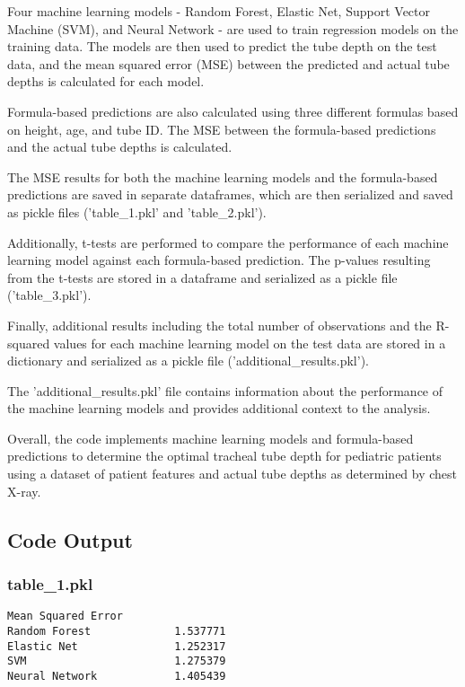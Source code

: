 \documentclass[11pt]{article}
\begin{document}
Four machine learning models - Random Forest, Elastic Net, Support Vector Machine (SVM), and Neural Network - are used to train regression models on the training data. The models are then used to predict the tube depth on the test data, and the mean squared error (MSE) between the predicted and actual tube depths is calculated for each model.

Formula-based predictions are also calculated using three different formulas based on height, age, and tube ID. The MSE between the formula-based predictions and the actual tube depths is calculated.

The MSE results for both the machine learning models and the formula-based predictions are saved in separate dataframes, which are then serialized and saved as pickle files ('table\_1.pkl' and 'table\_2.pkl').

Additionally, t-tests are performed to compare the performance of each machine learning model against each formula-based prediction. The p-values resulting from the t-tests are stored in a dataframe and serialized as a pickle file ('table\_3.pkl').

Finally, additional results including the total number of observations and the R-squared values for each machine learning model on the test data are stored in a dictionary and serialized as a pickle file ('additional\_results.pkl').

The 'additional\_results.pkl' file contains information about the performance of the machine learning models and provides additional context to the analysis.

Overall, the code implements machine learning models and formula-based predictions to determine the optimal tracheal tube depth for pediatric patients using a dataset of patient features and actual tube depths as determined by chest X-ray.

\subsection{Code Output}

\subsubsection*{table\_1.pkl}

\begin{Verbatim}[tabsize=4]
                Mean Squared Error
Random Forest             1.537771
Elastic Net               1.252317
SVM                       1.275379
Neural Network            1.405439
\end{Verbatim}
\end{document}
